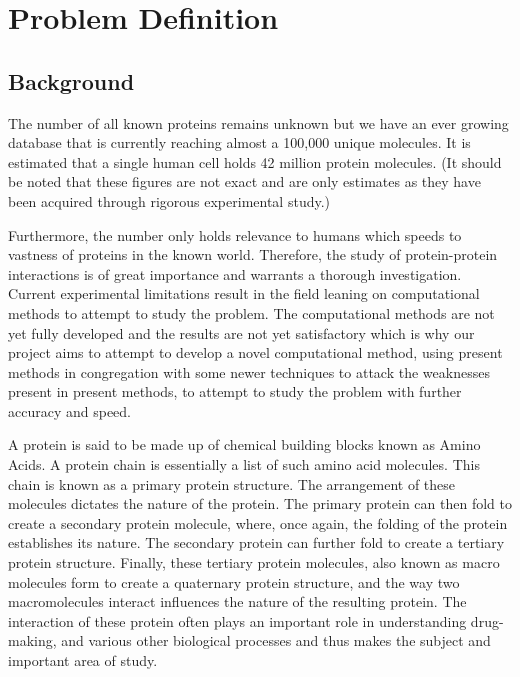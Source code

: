 \documentclass[11pt]{article}
\begin{document}



\section{Problem Definition}
\label{lblPD}

    \subsection{Background}
    The number of all known proteins remains unknown but we have an ever growing database that is currently reaching almost a 100,000 unique molecules. It is estimated that a single human cell holds 42 million protein molecules. (It should be noted that these figures are not exact and are only estimates as they have been acquired through rigorous experimental study.)
    
    Furthermore, the number only holds relevance to humans which speeds to vastness of proteins in the known world. Therefore, the study of protein-protein interactions is of great importance and warrants a thorough investigation. Current experimental limitations result in the field leaning on computational methods to attempt to study the problem. The computational methods are not yet fully developed and the results are not yet satisfactory which is why our project aims to attempt to develop a novel computational method, using present methods in congregation with some newer techniques to attack the weaknesses present in present methods, to attempt to study the problem with further accuracy and speed. 
    
    A protein is said to be made up of chemical building blocks known as Amino Acids. A protein chain is essentially a list of such amino acid molecules. This chain is known as a primary protein structure. The arrangement of these molecules dictates the nature of the protein. The primary protein can then fold to create a secondary protein molecule, where, once again, the folding of the protein establishes its nature. The secondary protein can further fold to create a tertiary protein structure. Finally, these tertiary protein molecules, also known as macro molecules form to create a quaternary protein structure, and the way two macromolecules interact influences the nature of the resulting protein. The interaction of these protein often plays an important role in understanding drug-making, and various other biological processes and thus makes the subject and important area of study.
    
\end{document}

